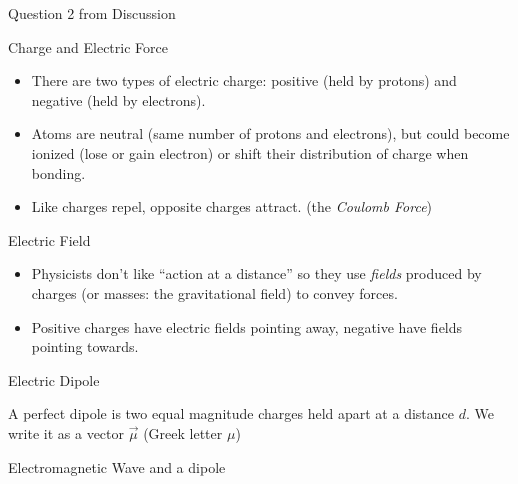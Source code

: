 \documentclass[12pt]{beamer}
\begin{document}
\begin{frame}{Question 2 from Discussion}



\end{frame}
\begin{frame}{Charge and Electric Force}

\begin{itemize}
\item There are two types of electric charge: positive (held by protons) and negative (held by electrons). 
\item Atoms are neutral (same number of protons and electrons), but could become ionized (lose or gain electron) or shift their distribution of charge when bonding.
\item Like charges repel, opposite charges attract. (the {\em Coulomb Force})
\end{itemize}

\vspace{4cm}

\end{frame}
\begin{frame}{Electric Field}

\begin{itemize}
\item Physicists don't like ``action at a distance'' so they use {\em fields} produced by charges (or masses: the gravitational field) to convey forces.
\item Positive charges have electric fields pointing away, negative have fields pointing towards.
\end{itemize}

\vspace{5cm}

\end{frame}
\begin{frame}{Electric Dipole}

\noindent A perfect dipole is two equal magnitude charges held apart at a distance $d$.  We write it as a vector $\vec{\mu}$ (Greek letter $\mu$)

\vspace{7cm}

\end{frame}
\begin{frame}{Electromagnetic Wave and a dipole}



\vspace{7cm}


\end{frame}
\end{document}
